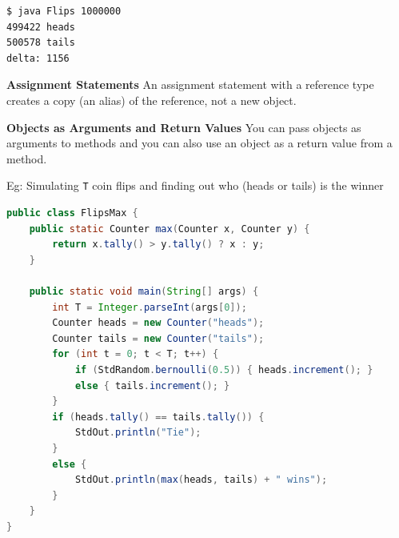 \documentclass[8pt,a4paper,compress]{beamer}
\begin{document}
\begin{frame}[fragile]
\pause

\begin{lstlisting}[language=bash]
$ java Flips 1000000
499422 heads
500578 tails
delta: 1156
\end{lstlisting}

\pause
\smallskip

\textbf{Assignment Statements} An assignment statement with a reference type creates a copy (an alias) of the reference, not a new object. 

\pause
\smallskip

\textbf{Objects as Arguments and Return Values} You can pass objects as arguments to methods and you can also use an object as a return value from a method.

\pause
\smallskip

Eg: Simulating \lstinline$T$ coin flips and finding out who (heads or tails) is the winner

\begin{lstlisting}[language=Java]
public class FlipsMax {
    public static Counter max(Counter x, Counter y) {
        return x.tally() > y.tally() ? x : y;
    }

    public static void main(String[] args) {
        int T = Integer.parseInt(args[0]);
        Counter heads = new Counter("heads");
        Counter tails = new Counter("tails");
        for (int t = 0; t < T; t++) {
            if (StdRandom.bernoulli(0.5)) { heads.increment(); }
            else { tails.increment(); }
        }
        if (heads.tally() == tails.tally()) {
            StdOut.println("Tie");
        }
        else {
            StdOut.println(max(heads, tails) + " wins");
        }
    }
}
\end{lstlisting}

\end{frame}
\end{document}
